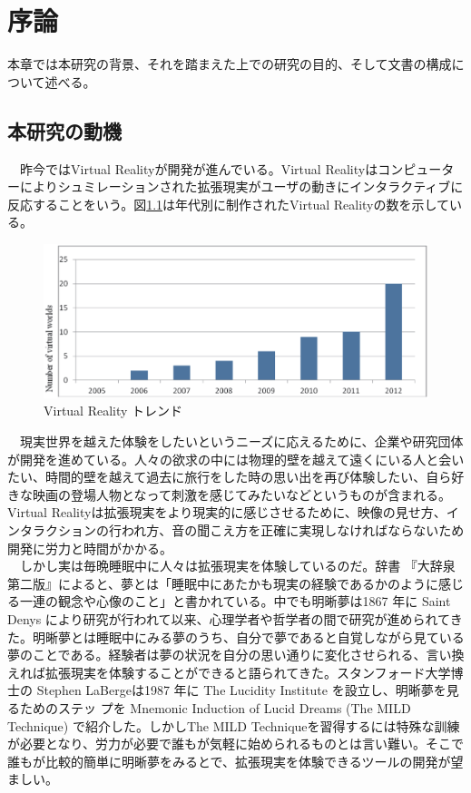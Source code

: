 \chapter{序論}
\label{chap:introduction}

本章では本研究の背景、それを踏まえた上での研究の目的、そして文書の構成について述べる。

\section{本研究の動機}
　昨今ではVirtual Realityが開発が進んでいる\cite{vrtrendShiny}。Virtual Realityはコンピューターによりシュミレーションされた拡張現実がユーザの動きにインタラクティブに反応することをいう。図\ref{trends}は年代別に制作されたVirtual Realityの数を示している\cite{vrtrendSamuel}。\\

\begin{figure}[htbp]
\begin{center}
\includegraphics[width=15cm]{eps/vrTrends.eps}
\caption{Virtual Reality トレンド}
\label{trends}
\end{center}
\end{figure}

　現実世界を越えた体験をしたいというニーズに応えるために、企業や研究団体が開発を進めている。人々の欲求の中には物理的壁を越えて遠くにいる人と会いたい、時間的壁を越えて過去に旅行をした時の思い出を再び体験したい、自ら好きな映画の登場人物となって刺激を感じてみたいなどというものが含まれる。Virtual Realityは拡張現実をより現実的に感じさせるために、映像の見せ方、インタラクションの行われ方、音の聞こえ方を正確に実現しなければならないため開発に労力と時間がかかる\cite{vrtrendShiny}。\\
　しかし実は毎晩睡眠中に人々は拡張現実を体験しているのだ。辞書 『大辞泉 第二版』によると、夢とは「睡眠中にあたかも現実の経験であるかのように感じる一連の観念や心像のこと」\cite{dream}と書かれている。中でも明晰夢は1867 年に Saint Denys により研究が行われて以来\cite{saintDenys}、心理学者や哲学者の間で研究が進められてきた。明晰夢とは睡眠中にみる夢のうち、自分で夢であると自覚しながら見ている夢のことである。経験者は夢の状況を自分の思い通りに変化させられる、言い換えれば拡張現実を体験することができると語られてきた。スタンフォード大学博士の Stephen LaBergeは1987 年に The Lucidity Institute を設立し、明晰夢を見るためのステッ プを Mnemonic Induction of Lucid Dreams (The MILD Technique) で紹介した\cite{LaBerge}。しかしThe MILD Techniqueを習得するには特殊な訓練が必要となり、労力が必要で誰もが気軽に始められるものとは言い難い。そこで誰もが比較的簡単に明晰夢をみるとで、拡張現実を体験できるツールの開発が望ましい。

